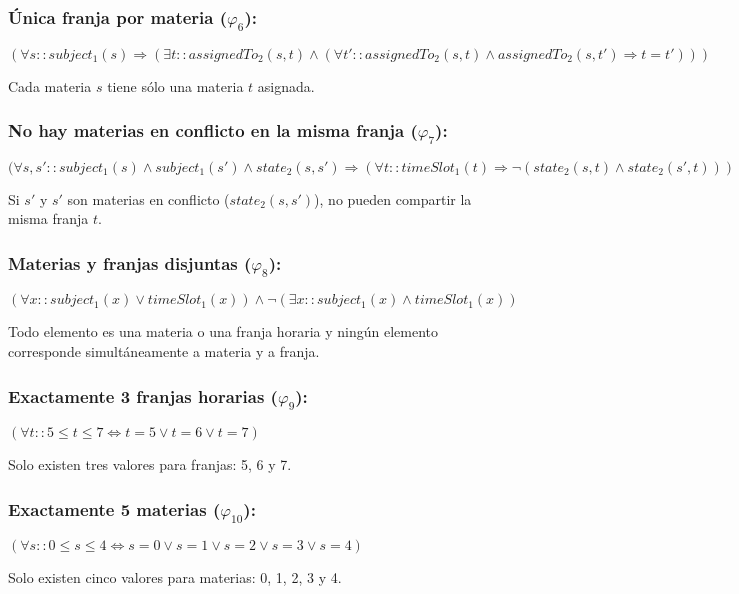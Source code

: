 \documentclass[a4paper,11pt]{article}
\begin{document}
\subsubsection{Única franja por materia ($\varphi_6$):}
\begin{center}
    $(\forall s :: subject_1(s) \Rightarrow (\exists t :: assignedTo_2(s, t) \land
        (\forall t' :: assignedTo_2(s, t) \land assignedTo_2(s, t') \Rightarrow t = t' )))$
\end{center}
Cada materia $s$ tiene sólo una materia $t$ asignada.

\subsubsection{No hay materias en conflicto en la misma franja ($\varphi_7$):}
\begin{center}
    $(\forall s, s' :: subject_1(s) \land subject_1(s') \land state_2(s, s') \Rightarrow
        (\forall t :: timeSlot_1(t) \Rightarrow \neg (state_2(s, t) \land state_2(s', t)))$
\end{center}
Si $s'$ y $s'$ son materias en conflicto ($state_2(s, s')$), no pueden compartir la misma franja $t$.

\subsubsection{Materias y franjas disjuntas ($\varphi_8$):}
\begin{center}
    $(\forall x :: subject_1(x) \lor timeSlot_1(x)) \land \neg(\exists x :: subject_1(x) \land timeSlot_1(x))$
\end{center}
Todo elemento es una materia o una franja horaria y ningún elemento corresponde simultáneamente a materia y a franja.

\subsubsection{Exactamente 3 franjas horarias ($\varphi_9$):}
\begin{center}
    $(\forall t :: 5 \leq t \leq 7 \Leftrightarrow t = 5 \lor t = 6 \lor t = 7)$
\end{center}
Solo existen tres valores para franjas: 5, 6 y 7.

\subsubsection{Exactamente 5 materias ($\varphi_{10}$):}
\begin{center}
    $(\forall s :: 0 \leq s \leq 4 \Leftrightarrow s = 0 \lor s = 1 \lor s = 2 \lor s = 3 \lor s = 4)$
\end{center}
Solo existen cinco valores para materias: 0, 1, 2, 3 y 4.
\end{document}
